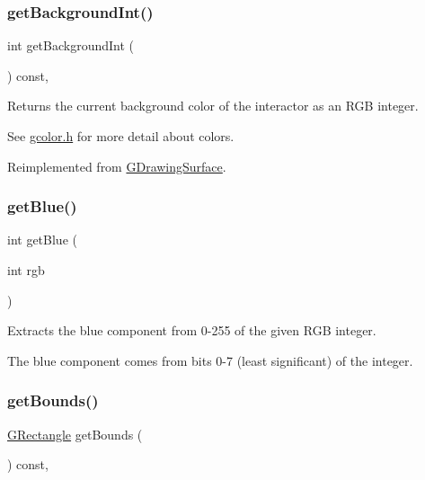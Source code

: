 \subsubsection{\texorpdfstring{get\+Background\+Int()}{getBackgroundInt()}}
{\footnotesize\ttfamily int get\+Background\+Int (\begin{DoxyParamCaption}{ }\end{DoxyParamCaption}) const\hspace{0.3cm}{\ttfamily [override]}, {\ttfamily [virtual]}}



Returns the current background color of the interactor as an R\+GB integer. 

See \mbox{\hyperlink{gcolor_8h_source}{gcolor.\+h}} for more detail about colors. 

Reimplemented from \mbox{\hyperlink{classGDrawingSurface_a9e827257a55cb8cf4d9de2ec6bcfd7a0}{G\+Drawing\+Surface}}.

\mbox{\label{classGCanvas_a9406c01e6961257db37b5dc95945f914}} 
\subsubsection{\texorpdfstring{get\+Blue()}{getBlue()}}
{\footnotesize\ttfamily int get\+Blue (\begin{DoxyParamCaption}\item[{int}]{rgb }\end{DoxyParamCaption})\hspace{0.3cm}{\ttfamily [static]}}



Extracts the blue component from 0-\/255 of the given R\+GB integer. 

The blue component comes from bits 0-\/7 (least significant) of the integer. \mbox{\label{classGInteractor_a29e6ac35a0b48f491a4c88194cc5da3b}} 
\subsubsection{\texorpdfstring{get\+Bounds()}{getBounds()}}
{\footnotesize\ttfamily \mbox{\hyperlink{structGRectangle}{G\+Rectangle}} get\+Bounds (\begin{DoxyParamCaption}{ }\end{DoxyParamCaption}) const\hspace{0.3cm}{\ttfamily [virtual]}, {\ttfamily [inherited]}}



